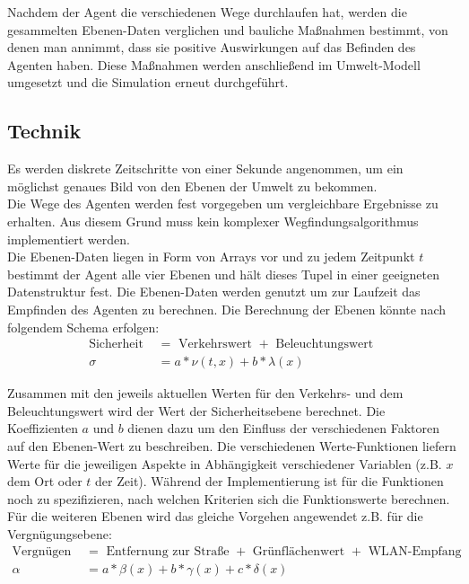 \documentclass[10pt]{scrartcl}
\begin{document}
Nachdem der Agent die verschiedenen Wege durchlaufen hat, werden die gesammelten Ebenen-Daten verglichen und bauliche Maßnahmen bestimmt, von denen man annimmt, dass sie positive Auswirkungen auf das Befinden des Agenten haben. Diese Maßnahmen werden anschließend im Umwelt-Modell umgesetzt und die Simulation erneut durchgeführt.

\subsection{Technik}
Es werden diskrete Zeitschritte von einer Sekunde angenommen, um ein möglichst genaues Bild von den Ebenen der Umwelt zu bekommen.\\
Die Wege des Agenten werden fest vorgegeben um vergleichbare Ergebnisse zu erhalten. Aus diesem Grund muss kein komplexer Wegfindungsalgorithmus implementiert werden.\\
Die Ebenen-Daten liegen in Form von Arrays vor und zu jedem Zeitpunkt $t$ bestimmt der Agent alle vier Ebenen und hält dieses Tupel in einer geeigneten Datenstruktur fest. Die Ebenen-Daten werden genutzt um zur Laufzeit das Empfinden des Agenten zu berechnen.
Die Berechnung der Ebenen könnte nach folgendem Schema erfolgen:
\begin{align}
	\text{Sicherheit } &= \text{ Verkehrswert } + \text{ Beleuchtungswert }\\
	\sigma &= a * \nu(t,x) + b * \lambda(x)
\end{align}

Zusammen mit den jeweils aktuellen Werten für den Verkehrs- und dem Beleuchtungswert wird der Wert der Sicherheitsebene berechnet.
Die Koeffizienten $a$ und $b$ dienen dazu um den Einfluss der verschiedenen Faktoren auf den Ebenen-Wert zu beschreiben.
Die verschiedenen Werte-Funktionen liefern Werte für die jeweiligen Aspekte in Abhängigkeit verschiedener Variablen (z.B. $x$ dem Ort oder $t$ der Zeit).
Während der Implementierung ist für die Funktionen noch zu spezifizieren, nach welchen Kriterien sich die Funktionswerte berechnen.
Für die weiteren Ebenen wird das gleiche Vorgehen angewendet z.B. für die Vergnügungsebene:
\begin{align}
	\text{Vergnügen } &= \text{ Entfernung zur Straße } + \text{ Grünflächenwert } + \text{ WLAN-Empfang}\\
	\alpha &= a * \beta(x) + b * \gamma(x) + c * \delta(x)
\end{align}
\end{document}
